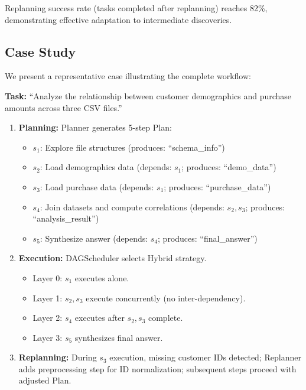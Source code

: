 \documentclass{article}
\theoremstyle{definition}
\begin{document}
Replanning success rate (tasks completed after replanning) reaches 82\%, demonstrating effective adaptation to intermediate discoveries.

\subsection{Case Study}

We present a representative case illustrating the complete workflow:

\textbf{Task:} ``Analyze the relationship between customer demographics and purchase amounts across three CSV files.''

\begin{enumerate}[leftmargin=1.5em]
    \item \textbf{Planning:} Planner generates 5-step Plan:
    \begin{itemize}[leftmargin=1em]
        \item $s_1$: Explore file structures (produces: ``schema\_info'')
        \item $s_2$: Load demographics data (depends: $s_1$; produces: ``demo\_data'')
        \item $s_3$: Load purchase data (depends: $s_1$; produces: ``purchase\_data'')
        \item $s_4$: Join datasets and compute correlations (depends: $s_2, s_3$; produces: ``analysis\_result'')
        \item $s_5$: Synthesize answer (depends: $s_4$; produces: ``final\_answer'')
    \end{itemize}

    \item \textbf{Execution:} DAGScheduler selects Hybrid strategy.
    \begin{itemize}[leftmargin=1em]
        \item Layer 0: $s_1$ executes alone.
        \item Layer 1: $s_2, s_3$ execute concurrently (no inter-dependency).
        \item Layer 2: $s_4$ executes after $s_2, s_3$ complete.
        \item Layer 3: $s_5$ synthesizes final answer.
    \end{itemize}

    \item \textbf{Replanning:} During $s_3$ execution, missing customer IDs detected; Replanner adds preprocessing step for ID normalization; subsequent steps proceed with adjusted Plan.
\end{enumerate}
\end{document}
